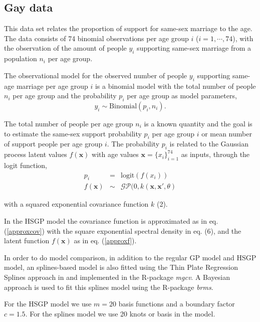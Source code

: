 \documentclass[]{interact}
\theoremstyle{plain}%
\theoremstyle{definition}
\theoremstyle{remark}
\begin{document}
\subsection{Gay data}\label{sec:gay_data}
This data set relates the proportion of support for same-sex marriage to the age. The data consists of 74 binomial observations per age group $i$ ($i=1,\cdots,74$), with the observation of the amount of people $y_i$ supporting same-sex marriage from a population $n_i$ per age group. 

The observational model for the observed number of people $y_i$ supporting same-age marriage per age group $i$ is a binomial model with the total number of people $n_i$ per age group and the probability $p_i$ per age group as model parameters,
%
\begin{equation*}
y_i \sim \text{Binomial}(p_i, n_i).
\end{equation*}

\noindent The total number of people per age group $n_i$ is a known quantity and the goal is to estimate the same-sex support probability $p_i$ per age group $i$ or mean number of support people per age group $i$. The probability $p_i$ is related to the Gaussian process latent values $f(\mathbf{x})$ with age values $\mathbf{x}=\{x_i\}_{i=1}^{74}$ as inputs, through the logit function,
%
\begin{eqnarray*} \label{eq:gpprior_gay}
p_i &=& \text{logit}(f(x_i)) \nonumber \\
f(\mathbf{x}) &\sim& \mathcal{GP}(0, k(\mathbf{x},\mathbf{x}', \theta)
\end{eqnarray*}

\noindent with a squared exponential covariance function $k$ (2). 

In the HSGP model the covariance function is approximated as in eq. (\ref{approxcov}) with the square exponential spectral density in eq. (6), and the latent function $f(\mathbf{x})$ as in eq. (\ref{approxf}). 

In order to do model comparison, in addition to the regular GP model and HSGP model, an splines-based model is also fitted using the Thin Plate Regression Splines approach in \cite{wood2003thin} and implemented in the R-package \textit{mgcv}. A Bayesian approach is used to fit this splines model using the R-package \textit{brms}.

For the HSGP model we use $m=20$ basis functions and a boundary factor $c=1.5$. For the splines model we use 20 knots or basis in the model.
\end{document}
